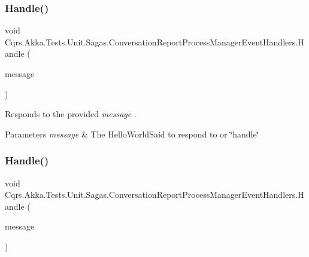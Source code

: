 \subsubsection{\texorpdfstring{Handle()}{Handle()}\hspace{0.1cm}{\footnotesize\ttfamily [2/3]}}
{\footnotesize\ttfamily void Cqrs.\+Akka.\+Tests.\+Unit.\+Sagas.\+Conversation\+Report\+Process\+Manager\+Event\+Handlers.\+Handle (\begin{DoxyParamCaption}\item[{\hyperlink{classCqrs_1_1Akka_1_1Tests_1_1Unit_1_1Events_1_1HelloWorldSaid}{Hello\+World\+Said}}]{message }\end{DoxyParamCaption})}



Responds to the provided {\itshape message} . 


\begin{DoxyParams}{Parameters}
{\em message} & The Hello\+World\+Said to respond to or \char`\"{}handle\char`\"{}\\
\hline
\end{DoxyParams}
\mbox{\label{classCqrs_1_1Akka_1_1Tests_1_1Unit_1_1Sagas_1_1ConversationReportProcessManagerEventHandlers_a8d31b621db17f2beba78e98a0040f384_a8d31b621db17f2beba78e98a0040f384}} 
\subsubsection{\texorpdfstring{Handle()}{Handle()}\hspace{0.1cm}{\footnotesize\ttfamily [3/3]}}
{\footnotesize\ttfamily void Cqrs.\+Akka.\+Tests.\+Unit.\+Sagas.\+Conversation\+Report\+Process\+Manager\+Event\+Handlers.\+Handle (\begin{DoxyParamCaption}\item[{\hyperlink{classCqrs_1_1Akka_1_1Tests_1_1Unit_1_1Events_1_1ConversationEnded}{Conversation\+Ended}}]{message }\end{DoxyParamCaption})}



